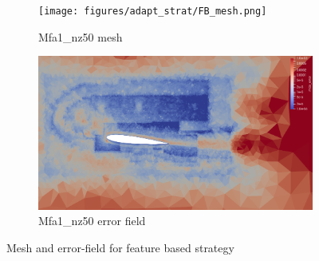 \begin{figure}[H]
\centering

\begin{subfigure}[b]{0.475\textwidth}
\centering
\texttt{[image: figures/adapt\_strat/FB\_mesh.png]}
\caption{Mfa1\_nz50 mesh}
\label{fig:FB_mesh}
\end{subfigure}
\begin{subfigure}[b]{0.475\textwidth}
\centering
\includegraphics[width=1\textwidth]{figures/adapt_strat/FB_error_plot.png}
\caption{Mfa1\_nz50 error field}
\label{fig:FB_error_plot}
\end{subfigure}

\caption{Mesh and error-field for feature based strategy}
\end{figure}